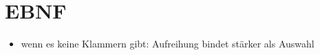 \documentclass[UTF8]{ctexart}
\begin{document}
\section{EBNF}

\begin{itemize}
    \item wenn es keine Klammern gibt: Aufreihung bindet stärker als Auswahl
\end{itemize}
\end{document}
